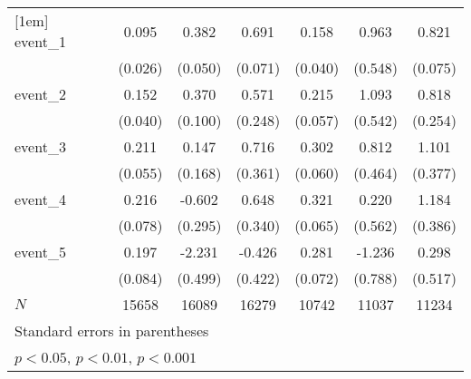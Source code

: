 {\begin{tabular}{l*{6}{c}}
[1em]
event\_1     &       0.095\sym{***}&       0.382\sym{***}&       0.691\sym{***}&       0.158\sym{***}&       0.963         &       0.821\sym{***}\\
            &     (0.026)         &     (0.050)         &     (0.071)         &     (0.040)         &     (0.548)         &     (0.075)         \\
[1em]
event\_2     &       0.152\sym{***}&       0.370\sym{***}&       0.571\sym{*}  &       0.215\sym{***}&       1.093\sym{*}  &       0.818\sym{**} \\
            &     (0.040)         &     (0.100)         &     (0.248)         &     (0.057)         &     (0.542)         &     (0.254)         \\
[1em]
event\_3     &       0.211\sym{***}&       0.147         &       0.716\sym{*}  &       0.302\sym{***}&       0.812         &       1.101\sym{**} \\
            &     (0.055)         &     (0.168)         &     (0.361)         &     (0.060)         &     (0.464)         &     (0.377)         \\
[1em]
event\_4     &       0.216\sym{**} &      -0.602\sym{*}  &       0.648         &       0.321\sym{***}&       0.220         &       1.184\sym{**} \\
            &     (0.078)         &     (0.295)         &     (0.340)         &     (0.065)         &     (0.562)         &     (0.386)         \\
[1em]
event\_5     &       0.197\sym{*}  &      -2.231\sym{***}&      -0.426         &       0.281\sym{***}&      -1.236         &       0.298         \\
            &     (0.084)         &     (0.499)         &     (0.422)         &     (0.072)         &     (0.788)         &     (0.517)         \\
\hline
\(N\)       &       15658         &       16089         &       16279         &       10742         &       11037         &       11234         \\
\hline\hline
\multicolumn{7}{l}{\footnotesize Standard errors in parentheses}\\
\multicolumn{7}{l}{\footnotesize \sym{*} \(p<0.05\), \sym{**} \(p<0.01\), \sym{***} \(p<0.001\)}\\
\end{tabular}
}
